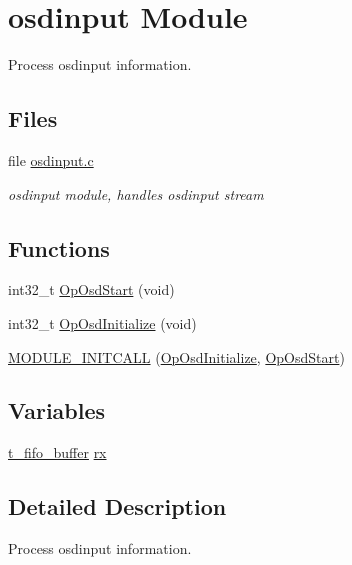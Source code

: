 \hypertarget{group__osdinput_module}{\section{osdinput \-Module}
\label{group__osdinput_module}
}


\-Process osdinput information.  


\subsection*{\-Files}
\begin{DoxyCompactItemize}
\item 
file \hyperlink{osdinput_8c}{osdinput.\-c}
\begin{DoxyCompactList}\small\item\em osdinput module, handles osdinput stream \end{DoxyCompactList}\end{DoxyCompactItemize}
\subsection*{\-Functions}
\begin{DoxyCompactItemize}
\item 
int32\-\_\-t \hyperlink{group__osdinput_module_gaaba21100503d866b583940aa3bc550b3}{\-Op\-Osd\-Start} (void)
\item 
int32\-\_\-t \hyperlink{group__osdinput_module_ga312c7d8bcb66b8430bd009bd7128bba7}{\-Op\-Osd\-Initialize} (void)
\item 
\hyperlink{group__osdinput_module_ga31db709dbe6f535319711b191f1ef781}{\-M\-O\-D\-U\-L\-E\-\_\-\-I\-N\-I\-T\-C\-A\-L\-L} (\hyperlink{group__osdinput_module_ga312c7d8bcb66b8430bd009bd7128bba7}{\-Op\-Osd\-Initialize}, \hyperlink{group__osdinput_module_gaaba21100503d866b583940aa3bc550b3}{\-Op\-Osd\-Start})
\end{DoxyCompactItemize}
\subsection*{\-Variables}
\begin{DoxyCompactItemize}
\item 
\hyperlink{structt__fifo__buffer}{t\-\_\-fifo\-\_\-buffer} \hyperlink{group__osdinput_module_ga666084f476b4a75298efd53fc6dc3203}{rx}
\end{DoxyCompactItemize}


\subsection{\-Detailed \-Description}
\-Process osdinput information. 

